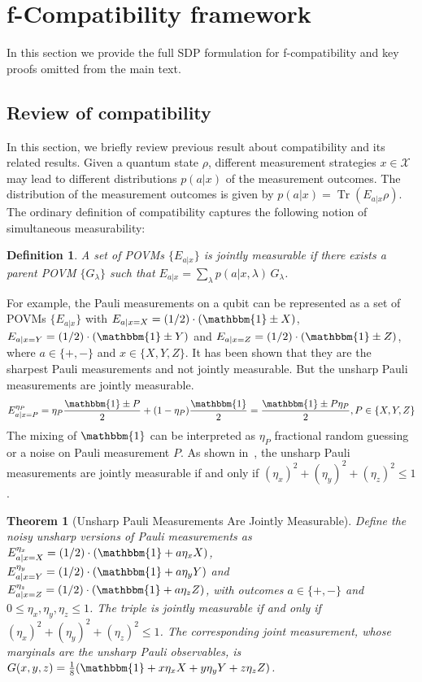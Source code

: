 \documentclass[aps,%
twocolumn,%
floatfix,%
pra,%
amsfonts,%
groupedaddress,%
superscriptaddress]{revtex4-2}%
\newtheorem{theorem}{Theorem}
\newtheorem{definition}{Definition}[section]
\DeclareMathOperator{\tr}{Tr}
\newcommand{\1}{\mathbbm{1}}
\begin{document}
\section{f-Compatibility framework}\label{app:f-compat}

In this section we provide the full SDP formulation for f-compatibility and key proofs omitted from the main text.

\subsection{Review of compatibility}

In this section, we briefly review previous result about compatibility and its related results.
Given a quantum state $\rho$, different measurement strategies $x \in \mathcal{X}$ may lead to different distributions $p(a|x)$ of the measurement outcomes. 
The distribution of the measurement outcomes is given by $p(a|x) = \tr(E_{a|x}\rho)$.
The ordinary definition of compatibility captures the following notion of simultaneous measurability:
\begin{definition}
    A set of POVMs $\{E_{a|x}\}$ is jointly measurable if there exists a parent POVM $\{G_\lambda\}$ such that $E_{a|x} = \sum_\lambda p(a|x,\lambda)\,G_\lambda$.
\end{definition}

For example, the Pauli measurements on a qubit can be represented as a set of POVMs $\{E_{a|x}\}$ with $E_{a|x = X} = (1/2)\cdot (\1 \pm  X)$, $E_{a|x = Y} = (1/2)\cdot (\1 \pm  Y )$  and $E_{a|x = Z} = (1/2)\cdot (\1\pm Z)$, where $a\in \{+,-\}$ and $x\in \{X, Y, Z\}$. 
It has been shown that they are the sharpest Pauli measurements and not jointly measurable. But the unsharp Pauli measurements are jointly measurable. 
$$
E^{\eta_{P}}_{a|x = P} = \eta_P \frac{\1 \pm P}{2} + (1 - \eta_P) \frac{\1}{2} =  \frac{\1 \pm P\eta_P}{2}, P \in \{X, Y, Z\}
$$
The mixing of $\1$ can be interpreted as $\eta_P$ fractional random guessing or a noise on Pauli measurement $P$.
As shown in~\cite{Busch1986}, the unsharp Pauli measurements are jointly measurable if and only if $(\eta_x)^2 + (\eta_y)^2 +(\eta_z)^2 \leq 1$.

\begin{theorem}[Unsharp Pauli Measurements Are Jointly Measurable]
Define the noisy unsharp versions of Pauli measurements as $E^{\eta_x}_{a|x = X} = (1/2)\cdot (\1 + a \eta_x X)$, $E^{\eta_y}_{a|x = Y} = (1/2)\cdot (\1 + a \eta_y Y )$  and $E^{\eta_z}_{a|x = Z} = (1/2)\cdot (\1+a\eta_z Z)$, with outcomes $a\in \{+,-\}$  and $0 \leq \eta_x, \eta_y, \eta_z \leq 1$.
The triple is jointly measurable if and only if $(\eta_x)^2 + (\eta_y)^2 +(\eta_z)^2 \leq 1$. The corresponding joint measurement, whose marginals are the unsharp Pauli observables, is  $G(x, y, z) = \frac{1}{8}(\1 + x\eta_x X + y\eta_y Y + z\eta_z Z)$.
\end{theorem}
\end{document}
